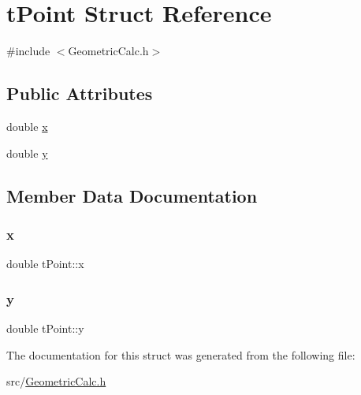 \hypertarget{structt_point}{}\section{t\+Point Struct Reference}
\label{structt_point}


{\ttfamily \#include $<$Geometric\+Calc.\+h$>$}

\subsection*{Public Attributes}
\begin{DoxyCompactItemize}
\item 
double \hyperlink{structt_point_a00e0256537c88142b0618b1286504b73}{x}
\item 
double \hyperlink{structt_point_af251026a3efb5fe7f96ff65af3b93e50}{y}
\end{DoxyCompactItemize}


\subsection{Member Data Documentation}
\mbox{\label{structt_point_a00e0256537c88142b0618b1286504b73}} 
\subsubsection{\texorpdfstring{x}{x}}
{\footnotesize\ttfamily double t\+Point\+::x}

\mbox{\label{structt_point_af251026a3efb5fe7f96ff65af3b93e50}} 
\subsubsection{\texorpdfstring{y}{y}}
{\footnotesize\ttfamily double t\+Point\+::y}



The documentation for this struct was generated from the following file\+:\begin{DoxyCompactItemize}
\item 
src/\hyperlink{_geometric_calc_8h}{Geometric\+Calc.\+h}\end{DoxyCompactItemize}
